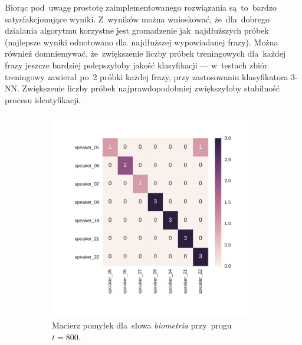 \documentclass[11pt,a4paper]{article}
\begin{document}
Biorąc pod~uwagę prostotę zaimplementowanego rozwiązania są~to~bardzo satysfakcjonujące wyniki.
Z~wyników można wnioskować, że~dla~dobrego działania algorytmu korzystne jest gromadzenie jak~najdłuższych próbek (najlepsze wyniki odnotowano dla~najdłuższej wypowiadanej frazy).
Można również domniemywać, że~zwiększenie liczby próbek treningowych dla~każdej frazy jeszcze bardziej polepszyłoby jakość klasyfikacji --- w~testach zbiór treningowy zawierał po~2 próbki każdej frazy, przy zastosowaniu klasyfikatora 3-NN.
Zwiększenie liczby próbek najprawdopodobniej zwiększyłoby stabilność procesu identyfikacji.

\begin{figure}
    \centering
    \begin{subfigure}[t]{0.45\textwidth}
        \includegraphics[width=\textwidth]{res/plots/confusion_matrix_biometria.pdf}
        \caption{Macierz pomyłek dla~słowa \emph{biometria} przy~progu~$t = 800$.}
    \end{subfigure}
    \qquad
    \begin{subfigure}[t]{0.45\textwidth}

\end{subfigure}
\end{figure}
\end{document}
